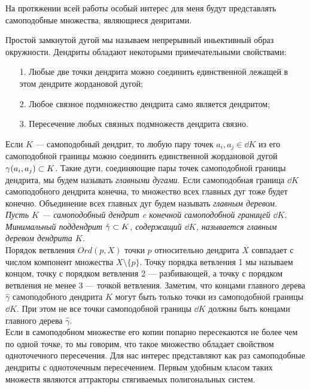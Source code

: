 На протяжении всей работы особый интерес для меня будут представлять самоподобные множества, являющиеся денритами. 


Простой замкнутой дугой мы называем непрерывный иньективный образ окружности.
Дендриты обладают некоторыми примечательными свойствами:
\begin{enumerate}[nolistsep]
\item[1.] Любые две точки дендрита можно соединить единственной лежащей в этом дендрите жордановой дугой;
\item[2.] Любое связное подмножество дендрита само является дендритом;
\item[3.] Пересечение любых связных подмножеств дендрита связно.
\end{enumerate}

Если $K$ --- самоподобный дендрит, то любую пару точек $a_i,a_j\in\dd K$ из его самоподобной границы можно соединить единственной жордановой дугой $\gamma(a_i,a_j)\subset K$.
Такие дуги, соединяющие пары точек самоподобной границы дендрита, мы будем называть {\em главными дугами}.
Если самоподобная граница $\dd K$ самоподобного дендрита конечна, то множество всех главных дуг тоже будет конечно.
Объединение всех главных дуг будем называть {\em главным деревом}.\\

{\em Пусть $K$ --- самоподобный дендрит c конечной самоподобной границей $\dd K$. 
Минимальный поддендрит $\hat\gamma\subset K$, содержащий $\dd K$, называется {\em главным деревом} дендрита $K$.}\\

Порядок ветвления $Ord(p,X)$ точки $p$ относительно дендрита $X$ совпадает с числом компонент множества $X\setminus\{p\}$.
Точку порядка ветвления 1 мы называем концом, точку с порядком ветвления 2 --- разбивающей, а точку с порядком ветвления не менее 3 --- точкой ветвления.
Заметим, что концами главного дерева $\hat\gamma$ самоподобного дендрита $K$ могут быть только точки из самоподобной границы $\dd K$.
При этом не все точки самоподобной границы $\dd K$ должны быть концами главного дерева $\hat\gamma$.\\

Если в самоподобном множестве его копии попарно пересекаются не более чем по одной точке, то мы говорим, что такое множество обладает свойством одноточечного пересечения.
Для нас интерес представляют как раз самоподобные дендриты с одноточечным пересечением.
Первым удобным класом таких множеств являются аттракторы стягиваемых полигональных систем.

